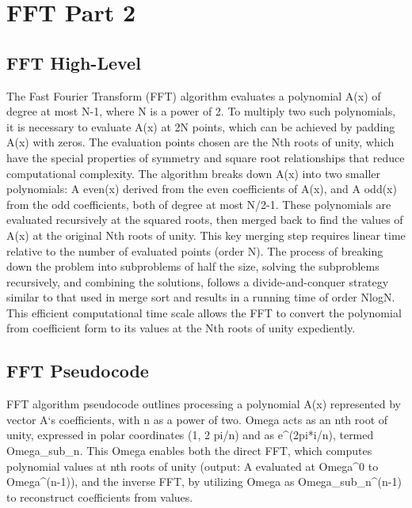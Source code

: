 \section*{FFT   Part 2}

\subsection*{FFT  High-Level}
The Fast Fourier Transform (FFT) algorithm evaluates a polynomial A(x) of degree at most N-1, where N is a power of 2.
To multiply two such polynomials, it is necessary to evaluate A(x) at 2N points, which can be achieved by padding A(x) with zeros.
The evaluation points chosen are the Nth roots of unity, which have the special properties of symmetry and square root relationships that reduce computational complexity.
The algorithm breaks down A(x) into two smaller polynomials: A even(x) derived from the even coefficients of A(x), and A odd(x) from the odd coefficients, both of degree at most N/2-1.
These polynomials are evaluated recursively at the squared roots, then merged back to find the values of A(x) at the original Nth roots of unity.
This key merging step requires linear time relative to the number of evaluated points (order N).
The process of breaking down the problem into subproblems of half the size, solving the subproblems recursively, and combining the solutions, follows a divide-and-conquer strategy similar to that used in merge sort and results in a running time of order NlogN\@.
This efficient computational time scale allows the FFT to convert the polynomial from coefficient form to its values at the Nth roots of unity expediently.

\subsection*{FFT  Pseudocode}
FFT algorithm pseudocode outlines processing a polynomial A(x) represented by vector A`s coefficients, with n as a power of two.
Omega acts as an nth root of unity, expressed in polar coordinates (1, 2 pi/n) and as e\textasciicircum{}(2pi*i/n), termed Omega\_sub\_n.
This Omega enables both the direct FFT, which computes polynomial values at nth roots of unity (output: A evaluated at Omega\textasciicircum{}0 to Omega\textasciicircum{}(n-1)), and the inverse FFT, by utilizing Omega as Omega\_sub\_n\textasciicircum{}(n-1) to reconstruct coefficients from values.

